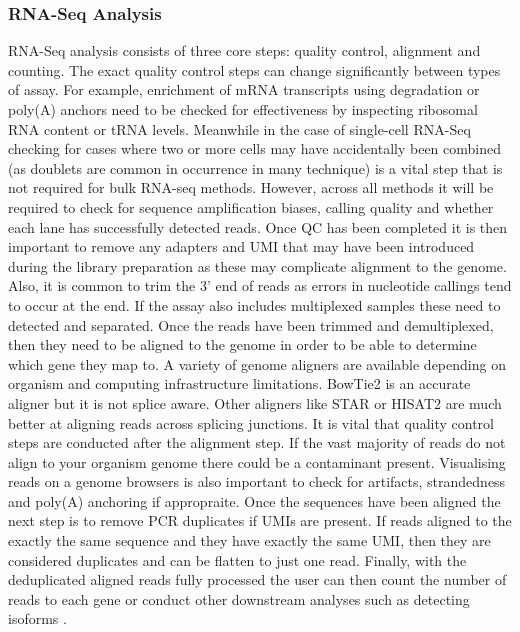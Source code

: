 \documentclass[../main.tex]{subfiles}
\begin{document}
\subsubsection{RNA-Seq Analysis}

RNA-Seq analysis consists of three core steps: quality control, alignment and counting. The exact quality control steps can change significantly between types of assay.
For example, enrichment of mRNA transcripts using degradation or poly(A) anchors need to be checked for effectiveness by inspecting ribosomal RNA content or tRNA levels.
Meanwhile in the case of single-cell RNA-Seq checking for cases where two or more cells may have accidentally been combined (as doublets are common in occurrence in many technique) is a vital step that is not required for bulk RNA-seq methods.
However, across all methods it will be required to check for sequence amplification biases, calling quality and whether each lane has successfully detected reads.
Once QC has been completed it is then important to remove any adapters and UMI that may have been introduced during the library preparation as these may complicate alignment to the genome. 
Also, it is common to trim the 3' end of reads as errors in nucleotide callings tend to occur at the end. 
If the assay also includes multiplexed samples these need to detected and separated. 
Once the reads have been trimmed and demultiplexed, then they need to be aligned to the genome in order to be able to determine which gene they map to.
A variety of genome aligners are available depending on organism and computing infrastructure limitations.  
BowTie2 is an accurate aligner but it is not splice aware.
Other aligners like STAR or HISAT2 are much better at aligning reads across splicing junctions. 
It is vital that quality control steps are conducted after the alignment step.
If the vast majority of reads do not align to your organism genome there could be a contaminant present. 
Visualising reads on a genome browsers is also important to check for artifacts, strandedness and poly(A) anchoring if appropraite. 
Once the sequences have been aligned the next step is to remove PCR duplicates if UMIs are present. 
If reads aligned to the exactly the same sequence and they have exactly the same UMI, then they are considered duplicates and can be flatten to just one read. 
Finally, with the deduplicated aligned reads fully processed the user can then count the number of reads to each gene or conduct other downstream analyses such as detecting isoforms \parencite{Conesa2016}.
\end{document}
